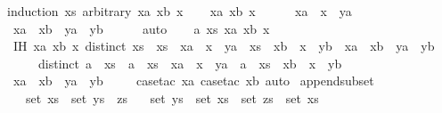 \begin{isabellebody}
{\isacharparenleft}induction\ xs\ arbitrary{\isacharcolon}\ xa\ xb\ x{\isacharparenright}\isanewline
\ \ \isamarkupfalse%
\ xa\ xb\ x\isanewline
\ \ \isamarkupfalse%
\ {\isachardoublequoteopen}{\isacharbrackleft}{\isacharbrackright}\ {\isacharequal}\ xa\ {\isacharat}\ x\ {\isacharhash}\ ya{\isachardoublequoteclose}\isanewline
\ \ \isamarkupfalse%
\ {\isachardoublequoteopen}xa\ {\isacharequal}\ xb\ {\isasymand}\ ya\ {\isacharequal}\ yb{\isachardoublequoteclose}\isanewline
\ \ \ \ \isamarkupfalse%
\ auto\isanewline
{}\isamarkupfalse%
\isanewline
\ \ \isamarkupfalse%
\ a\ xs\ xa\ xb\ x\isanewline
\ \ \isamarkupfalse%
\ IH{\isacharcolon}\ {\isachardoublequoteopen}{\isasymAnd}xa\ xb\ x{\isachardot}\ distinct\ xs\ {\isasymLongrightarrow}\ xs\ {\isacharequal}\ xa\ {\isacharat}\ x\ {\isacharhash}\ ya\ {\isasymLongrightarrow}\ xs\ {\isacharequal}\ xb\ {\isacharat}\ x\ {\isacharhash}\ yb\ {\isasymLongrightarrow}\ xa\ {\isacharequal}\ xb\ {\isasymand}\ ya\ {\isacharequal}\ yb{\isachardoublequoteclose}\isanewline
\ \ \ \ \ {\isachardoublequoteopen}distinct\ {\isacharparenleft}a\ {\isacharhash}\ xs{\isacharparenright}{\isachardoublequoteclose}\ \ {\isachardoublequoteopen}a\ {\isacharhash}\ xs\ {\isacharequal}\ xa\ {\isacharat}\ x\ {\isacharhash}\ ya{\isachardoublequoteclose}\ \ {\isachardoublequoteopen}a\ {\isacharhash}\ xs\ {\isacharequal}\ xb\ {\isacharat}\ x\ {\isacharhash}\ yb{\isachardoublequoteclose}\isanewline
\ \ \isamarkupfalse%
\ {\isachardoublequoteopen}xa\ {\isacharequal}\ xb\ {\isasymand}\ ya\ {\isacharequal}\ yb{\isachardoublequoteclose}\isanewline
\ \ \ \ \isamarkupfalse%
{\isacharparenleft}case{\isacharunderscore}tac\ xa{\isacharsemicolon}\ case{\isacharunderscore}tac\ xb{\isacharparenright}\ auto\isanewline
{}\isamarkupfalse%
%
\endisatagproof
{\isafoldproof}%
%
\isadelimproof
\isanewline
%
\endisadelimproof
\isanewline
{}\isamarkupfalse%
\ append{\isacharunderscore}subset{\isacharcolon}\isanewline
\ \ \ {\isachardoublequoteopen}set\ xs\ {\isacharequal}\ set\ {\isacharparenleft}ys\ {\isacharat}\ zs{\isacharparenright}{\isachardoublequoteclose}\isanewline
\ \ \ {\isachardoublequoteopen}set\ ys\ {\isasymsubseteq}\ set\ xs{\isachardoublequoteclose}\ \ {\isachardoublequoteopen}set\ zs\ {\isasymsubseteq}\ set\ xs{\isachardoublequoteclose}\isanewline
%
\isadelimproof
%
\endisadelimproof

\end{isabellebody}
